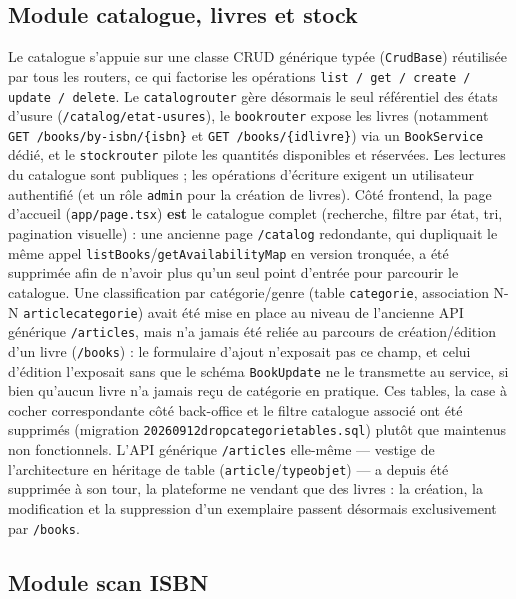 \documentclass[12pt, a4paper]{report}
\renewcommand{\_}{\origunderscore\allowbreak}
\begin{document}
\subsection{Module catalogue, livres et stock}

Le catalogue s'appuie sur une classe CRUD générique typée (\texttt{CrudBase}) réutilisée par tous les routers, ce qui factorise les opérations \texttt{list / get / create / update / delete}. Le \texttt{catalog\_router} gère désormais le seul référentiel des états d'usure (\texttt{/catalog/\allowbreak etat-usures}), le \texttt{book\_router} expose les livres (notamment \texttt{GET /books/\allowbreak by-isbn/\{isbn\}} et \texttt{GET /books/\allowbreak\{id\_livre\}}) via un \texttt{BookService} dédié, et le \texttt{stock\_router} pilote les quantités disponibles et réservées. Les lectures du catalogue sont publiques ; les opérations d'écriture exigent un utilisateur authentifié (et un rôle \texttt{admin} pour la création de livres). Côté frontend, la page d'accueil (\texttt{app/page.tsx}) \textbf{est} le catalogue complet (recherche, filtre par état, tri, pagination visuelle) : une ancienne page \texttt{/catalog} redondante, qui dupliquait le même appel \texttt{listBooks}\allowbreak/\texttt{getAvailabilityMap} en version tronquée, a été supprimée afin de n'avoir plus qu'un seul point d'entrée pour parcourir le catalogue. Une classification par catégorie/genre (table \texttt{categorie}, association N-N \texttt{article\_categorie}) avait été mise en place au niveau de l'ancienne API générique \texttt{/articles}, mais n'a jamais été reliée au parcours de création/édition d'un livre (\texttt{/books}) : le formulaire d'ajout n'exposait pas ce champ, et celui d'édition l'exposait sans que le schéma \texttt{BookUpdate} ne le transmette au service, si bien qu'aucun livre n'a jamais reçu de catégorie en pratique. Ces tables, la case à cocher correspondante côté back-office et le filtre catalogue associé ont été supprimés (migration \texttt{20260912\_drop\_categorie\_tables.sql}) plutôt que maintenus non fonctionnels. L'API générique \texttt{/articles} elle-même — vestige de l'architecture en héritage de table (\texttt{article}\allowbreak/\texttt{type\_objet}) — a depuis été supprimée à son tour, la plateforme ne vendant que des livres : la création, la modification et la suppression d'un exemplaire passent désormais exclusivement par \texttt{/books}.

\subsection{Module scan ISBN}
\end{document}
